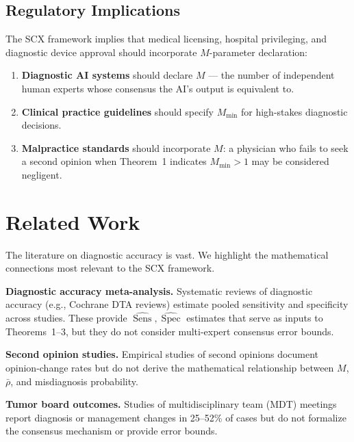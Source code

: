 \documentclass[11pt,a4paper]{article}
\theoremstyle{definition}
\newcommand{\SCX}{\textsc{SCX}}
\DeclareMathOperator{\Sens}{Sens}
\DeclareMathOperator{\Spec}{Spec}
\begin{document}
\subsection{Regulatory Implications}

The \SCX{} framework implies that medical licensing, hospital privileging,
and diagnostic device approval should incorporate $M$-parameter declaration:

\begin{enumerate}[nosep]
    \item \textbf{Diagnostic AI systems} should declare $M$ --- the number of
    independent human experts whose consensus the AI's output is equivalent to.
    \item \textbf{Clinical practice guidelines} should specify $M_{\min}$ for
    high-stakes diagnostic decisions.
    \item \textbf{Malpractice standards} should incorporate $M$: a physician
    who fails to seek a second opinion when Theorem~1 indicates $M_{\min} > 1$
    may be considered negligent.
\end{enumerate}

\section{Related Work}
\label{sec:related}

The literature on diagnostic accuracy is vast. We highlight the mathematical
connections most relevant to the \SCX{} framework.

\textbf{Diagnostic accuracy meta-analysis.} Systematic reviews of diagnostic
accuracy (e.g., Cochrane DTA reviews) estimate pooled sensitivity and
specificity across studies. These provide $\hat{\Sens}, \hat{\Spec}$ estimates
that serve as inputs to Theorems~1--3, but they do not consider multi-expert
consensus error bounds.

\textbf{Second opinion studies.} Empirical studies of second opinions
\cite{payne2014impact, bender2019second} document opinion-change rates
but do not derive the mathematical relationship between $M$, $\bar{\rho}$,
and misdiagnosis probability.

\textbf{Tumor board outcomes.} Studies of multidisciplinary team (MDT)
meetings \cite{pillay2016impact, lamb2011multidisciplinary} report diagnosis
or management changes in 25--52\% of cases but do not formalize the
consensus mechanism or provide error bounds.
\end{document}
